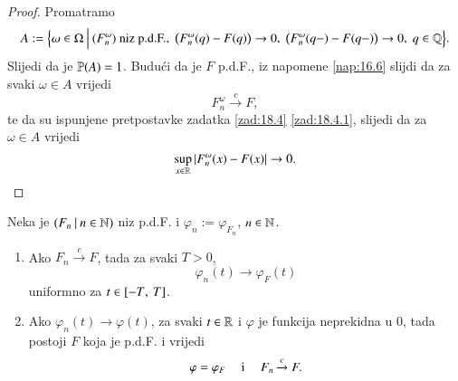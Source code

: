 \begin{proof}
    Promatramo
    \begin{equation*}
        A := \Big\{{\omega \in \Omega} \: \Big| \: {(F^\omega_n) \textnormal{ niz p.d.F.}, \; \big(F^\omega_n (q) - F(q) \big) \to 0, \; \big( F^\omega_n (q-) - F(q-) \big) \to 0, \; q \in \mathbb{Q}}\Big\}.
    \end{equation*}
    Slijedi da je $\mathbb{P} (A) = 1$.
    Budu\' ci da je $F$ p.d.F., iz napomene \ref{nap:16.6} slijdi da za svaki $\omega \in A$ vrijedi
    \begin{equation*}
        F^\omega_n \xrightarrow{c} F,
    \end{equation*}
    te da su ispunjene pretpostavke zadatka \ref{zad:18.4} \ref{zad:18.4.1}, slijedi da za $\omega \in A$ vrijedi
    \begin{equation*}
        \sup\limits_{x \in \mathbb{R}} |F^\omega_n (x) - F(x)| \to 0.
    \end{equation*}
\end{proof}

\begin{tm}  \label{tm:18.6}
    \quad \newline
    Neka je $({F_n} \: | \: {n \in \mathbb{N}})$ niz p.d.F. i $\varphi_n := \varphi_{F_n}$, $n \in \mathbb{N}$.
    \begin{enumerate}[label=(\roman*)]
        \item   \label{tm:18.6.1}
        Ako $F_n \xrightarrow{c} F$, tada za svaki $T > 0$,
        \begin{equation*}
            \varphi_n (t) \to \varphi_F (t)
        \end{equation*}
        uniformno za $t \in [{-T}, \:{T}]$.
        \item   \label{tm:18.6.2}
        Ako $\varphi_n (t) \to \varphi (t)$, za svaki $t \in \mathbb{R}$ i $\varphi$ je funkcija neprekidna u $0$, tada postoji $F$ koja je p.d.F. i vrijedi
        \begin{equation*}
            \varphi = \varphi_F \quad \textnormal{ i } \quad F_n \xrightarrow{c} F.
        \end{equation*}
    \end{enumerate}
\end{tm}